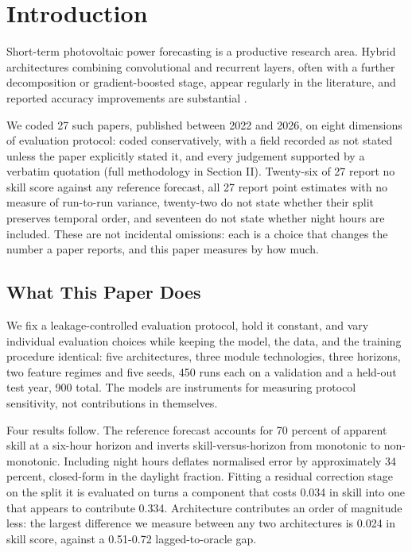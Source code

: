 \section{Introduction}
\label{sec:intro}

Short-term photovoltaic power forecasting is a productive research
area. Hybrid architectures combining convolutional and recurrent
layers, often with a further decomposition or gradient-boosted stage,
appear regularly in the literature, and reported accuracy improvements
are substantial \cite{nguyenmusgens2021drives}.

We coded 27 such papers, published between 2022 and 2026, on eight
dimensions of evaluation protocol: coded conservatively, with a field
recorded as not stated unless the paper explicitly stated it, and every
judgement supported by a verbatim quotation (full methodology in
Section II). Twenty-six of
27 report no skill score against any reference forecast, all 27 report
point estimates with no measure of run-to-run variance, twenty-two do
not state whether their split preserves temporal order, and seventeen
do not state whether night hours are included. These are not incidental
omissions: each is a choice that changes the number a paper reports,
and this paper measures by how much.

\subsection{What This Paper Does}
\label{sec:intro-what-this-paper-does}

We fix a leakage-controlled evaluation protocol, hold it constant, and
vary individual evaluation choices while keeping the model, the data,
and the training procedure identical: five architectures, three module
technologies, three horizons, two feature regimes and five seeds, 450
runs each on a validation and a held-out test year, 900 total. The
models are instruments for measuring protocol sensitivity, not
contributions in themselves.

Four results follow. The reference forecast accounts for 70 percent of
apparent skill at a six-hour horizon and inverts skill-versus-horizon
from monotonic to non-monotonic. Including night hours deflates
normalised error by approximately 34 percent, closed-form in the
daylight fraction. Fitting a residual correction stage on the split it
is evaluated on turns a component that costs 0.034 in skill into one
that appears to contribute 0.334. Architecture contributes an order of
magnitude less: the largest difference we measure between any two
architectures is 0.024 in skill score, against a 0.51-0.72
lagged-to-oracle gap.


